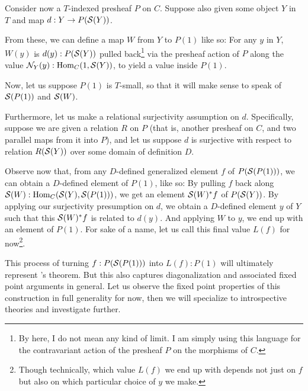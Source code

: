 Consider now a $T$-indexed presheaf $P$ on $C$. Suppose also given some object $Y$ in $T$ and map $d : Y \to P(\mathcal{S}(Y))$.

From these, we can define a map $W$ from $Y$ to $P(1)$ like so: For any $y$ in $Y$, $W(y)$ is $d(y) : P(\mathcal{S}(Y))$ pulled back\footnote{By  here, I do not mean any kind of limit. I am simply using this language for the contravariant action of the presheaf $P$ on the morphisms of $C$.} via the presheaf action of $P$ along the value $\mathcal{N}_Y(y) : \operatorname{Hom}_C(1, \mathcal{S}(Y))$, to yield a value inside $P(1)$.

Now, let us suppose $P(1)$ is $T$-small, so that it will make sense to speak of $\mathcal{S}(P(1))$ and $\mathcal{S}(W)$.

Furthermore, let us make a relational surjectivity assumption on $d$. Specifically, suppose we are given a relation $R$ on $P$ (that is, another presheaf on $C$, and two parallel maps from it into $P$), and let us suppose $d$ is surjective with respect to relation $R(\mathcal{S}(Y))$ over some domain of definition $D$.

Observe now that, from any $D$-defined generalized element $f$ of $P(\mathcal{S}(P(1)))$, we can obtain a $D$-defined element of $P(1)$, like so: By pulling $f$ back along $\mathcal{S}(W) : \operatorname{Hom}_C(\mathcal{S}(Y), \mathcal{S}(P(1)))$, we get an element $\mathcal{S}(W)^*f$ of $P(\mathcal{S}(Y))$. By applying our surjectivity presumption on $d$, we obtain a $D$-defined element $y$ of $Y$ such that this $\mathcal{S}(W)^*f$ is related to $d(y)$. And applying $W$ to $y$, we end up with an element of $P(1)$. For sake of a name, let us call this final value $L(f)$ for now\footnote{Though technically, which value $L(f)$ we end up with depends not just on $f$ but also on which particular choice of $y$ we make.}.

This process of turning $f: P(\mathcal{S}(P(1)))$ into $L(f): P(1)$ will ultimately represent \Loeb's theorem. But this also captures diagonalization and associated fixed point arguments in general. Let us observe the fixed point properties of this construction in full generality for now, then we will specialize to introspective theories and investigate further.

